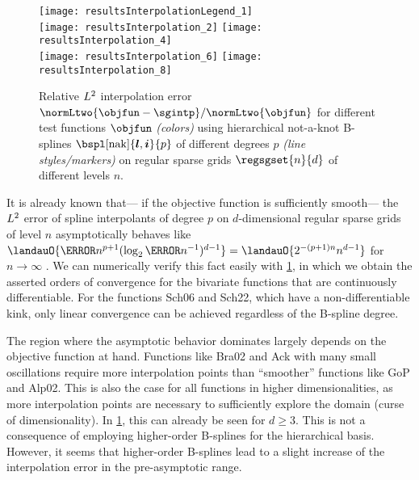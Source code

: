 \begin{figure}
  \texttt{[image: resultsInterpolationLegend\_1]}\\[2mm]%
  \texttt{[image: resultsInterpolation\_2]}%
  \hfill%
  \texttt{[image: resultsInterpolation\_4]}%
  \\[2mm]%
  \texttt{[image: resultsInterpolation\_6]}%
  \hfill%
  \texttt{[image: resultsInterpolation\_8]}%
  \caption[Relative interpolation error for different test functions]{%
    Relative $L^2$ interpolation error
    \vspace{-0.05em}%
    $\normLtwo{\objfun - \sgintp}/\normLtwo{\objfun}$
    for different test functions $\objfun$ \emph{(colors)}
    using hierarchical not-a-knot B-splines
    $\bspl[\nak]{\*l,\*i}{p}$ of different degrees $p$
    \emph{(line styles/markers)} on
    regular sparse grids $\regsgset{n}{d}$ of different levels $n$.%
  }%
  \label{fig:resultsInterpolationErrorTestFunctions}%
\end{figure}

It is already known that---%
if the objective function is sufficiently smooth---%
the $L^2$ error of spline interpolants of degree $p$ on
$d$-dimensional regular sparse grids of level $n$
asymptotically behaves like
$\landauO{\ms{n}^{p+1} (\log_2 \ms{n}^{-1})^{d-1}}
= \landauO{2^{-(p+1)n} n^{d-1}}$ for $n \to \infty$ \cite{Sickel11Spline}.
We can numerically verify this fact easily with
\cref{fig:resultsInterpolationErrorTestFunctions},
in which we obtain the asserted orders of convergence
for the bivariate functions that are continuously differentiable.
For the functions Sch06 and Sch22, which have a non-differentiable kink,
only linear convergence can be achieved regardless of the B-spline degree.

\vspace*{\fill}

The region where the asymptotic behavior dominates largely depends
on the objective function at hand.
Functions like Bra02 and Ack with many small oscillations
require more interpolation points than ``smoother'' functions like
GoP and Alp02.
This is also the case for all functions in higher dimensionalities,
as more interpolation points are necessary to sufficiently explore the domain
(curse of dimensionality).
In \cref{fig:resultsInterpolationErrorTestFunctions}, this can already be seen
for $d \ge 3$.
This is not a consequence of employing higher-order B-splines for
the hierarchical basis.
However, it seems that higher-order B-splines lead to a slight increase
of the interpolation error in the pre-asymptotic range.

